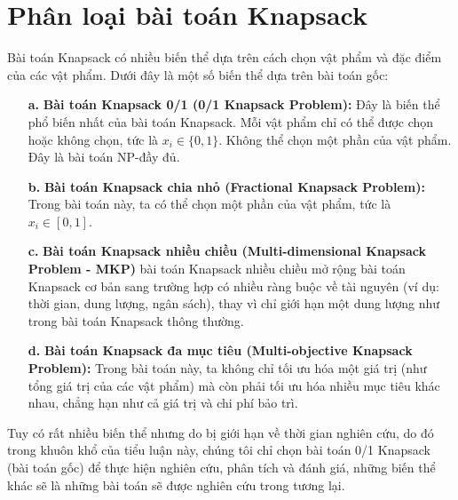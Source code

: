 \section{Phân loại bài toán Knapsack}
Bài toán Knapsack có nhiều biến thể dựa trên cách chọn vật phẩm và đặc điểm của các vật phẩm. Dưới đây là một số biến thể dựa trên bài toán gốc:
\begin{itemize}
    \item [\textbf{a.}] \textbf{Bài toán Knapsack 0/1 (0/1 Knapsack Problem):} Đây là biến thể phổ biến nhất của bài toán Knapsack. Mỗi vật phẩm chỉ có thể được chọn hoặc không chọn, tức là $x_i \in \{0,1\}$. Không thể chọn một phần của vật phẩm. Đây là bài toán NP-đầy đủ.
    \item [\textbf{b.}] \textbf{Bài toán Knapsack chia nhỏ (Fractional Knapsack Problem):} Trong bài toán này, ta có thể chọn một phần của vật phẩm, tức là $x_i \in [0,1]$.
    \item[\textbf{c.}] \textbf{Bài toán Knapsack nhiều chiều (Multi-dimensional Knapsack Problem - MKP)} bài toán Knapsack nhiều chiều mở rộng bài toán Knapsack cơ bản sang trường hợp có nhiều ràng buộc về tài nguyên (ví dụ: thời gian, dung lượng, ngân sách), thay vì chỉ giới hạn một dung lượng như trong bài toán Knapsack thông thường.
    \item [\textbf{d.}] \textbf{Bài toán Knapsack đa mục tiêu (Multi-objective Knapsack Problem):} Trong bài toán này, ta không chỉ tối ưu hóa một giá trị (như tổng giá trị của các vật phẩm) mà còn phải tối ưu hóa nhiều mục tiêu khác nhau, chẳng hạn như cả giá trị và chi phí bảo trì.
\end{itemize}

Tuy có rất nhiều biến thể nhưng do bị giới hạn về thời gian nghiên cứu, do đó trong khuôn khổ của tiểu luận này, chúng tôi chỉ chọn bài toán 0/1 Knapsack (bài toán gốc) để thực hiện nghiên cứu, phân tích và đánh giá, những biến thể khác sẽ là những bài toán sẽ được nghiên cứu trong tương lại.
